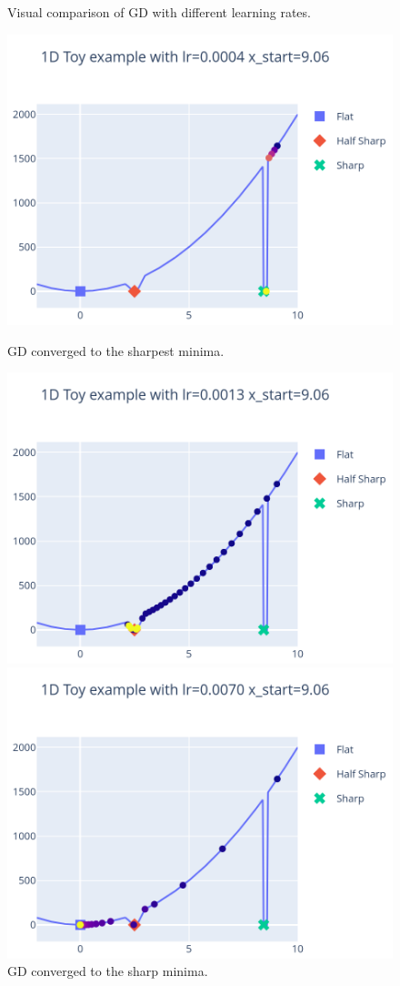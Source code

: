 \documentclass{article}
\theoremstyle{definition}
\begin{document}
\begin{figure}[!htb]
    \caption{Visual comparison of GD with different learning rates.}
      \includegraphics[width=\linewidth]{converge_to_sharp.png}
      \caption{GD converged to the sharpest minima.}
    \endminipage\hfill
      \includegraphics[width=\linewidth]{converge_to_half_sharp.png}
      \caption{GD converged to the sharp minima.}
    \endminipage\hfill
      \includegraphics[width=\linewidth]{converge_to_flat.png}

\end{figure}
\end{document}
